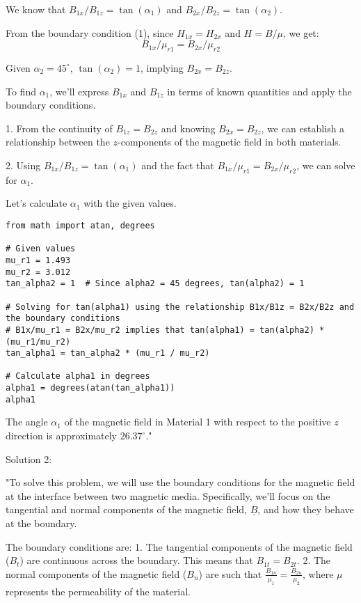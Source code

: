 We know that \( B_{1x}/B_{1z} = \tan(\alpha_{1}) \) and \( B_{2x}/B_{2z} = \tan(\alpha_{2}) \).

From the boundary condition (1), since \( H_{1x} = H_{2x} \) and \( H = B/\mu \), we get:
\[ B_{1x}/\mu_{r1} = B_{2x}/\mu_{r2} \]

Given \( \alpha_{2} = 45^\circ \), \( \tan(\alpha_{2}) = 1 \), implying \( B_{2x} = B_{2z} \).

To find \( \alpha_{1} \), we'll express \( B_{1x} \) and \( B_{1z} \) in terms of known quantities and apply the boundary conditions.

1. From the continuity of \( B_{1z} = B_{2z} \) and knowing \( B_{2x} = B_{2z} \), we can establish a relationship between the \( z \)-components of the magnetic field in both materials.

2. Using \( B_{1x}/B_{1z} = \tan(\alpha_{1}) \) and the fact that \( B_{1x}/\mu_{r1} = B_{2x}/\mu_{r2} \), we can solve for \( \alpha_{1} \).

Let's calculate \( \alpha_{1} \) with the given values.

\begin{verbatim}
from math import atan, degrees

# Given values
mu_r1 = 1.493
mu_r2 = 3.012
tan_alpha2 = 1  # Since alpha2 = 45 degrees, tan(alpha2) = 1

# Solving for tan(alpha1) using the relationship B1x/B1z = B2x/B2z and the boundary conditions
# B1x/mu_r1 = B2x/mu_r2 implies that tan(alpha1) = tan(alpha2) * (mu_r1/mu_r2)
tan_alpha1 = tan_alpha2 * (mu_r1 / mu_r2)

# Calculate alpha1 in degrees
alpha1 = degrees(atan(tan_alpha1))
alpha1
\end{verbatim}

The angle \( \alpha_{1} \) of the magnetic field in Material 1 with respect to the positive \( z \) direction is approximately \( 26.37^\circ \)."

Solution 2:

"To solve this problem, we will use the boundary conditions for the magnetic field at the interface between two magnetic media. Specifically, we'll focus on the tangential and normal components of the magnetic field, \( \underline{B} \), and how they behave at the boundary.

The boundary conditions are:
1. The tangential components of the magnetic field (\(B_{t}\)) are continuous across the boundary. This means that \(B_{1t} = B_{2t}\).
2. The normal components of the magnetic field (\(B_{n}\)) are such that \(\frac{B_{1n}}{\mu_{1}} = \frac{B_{2n}}{\mu_{2}}\), where \( \mu \) represents the permeability of the material.

